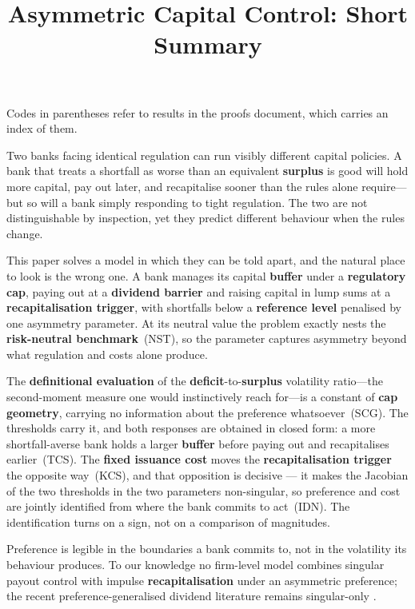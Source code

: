 \documentclass[11pt]{article}
\title{Asymmetric Capital Control: Short Summary}
\date{}
\begin{document}
\maketitle
\thispagestyle{empty}

\noindent
Codes in parentheses refer to results in the proofs document, which
carries an index of them.

\bigskip

Two banks facing identical regulation can run visibly different capital
policies. A bank that treats a shortfall as worse than an equivalent
\textbf{surplus} is good will hold more capital, pay out later, and
recapitalise sooner than the rules alone require---but so will a bank
simply responding to tight regulation. The two are not distinguishable by
inspection, yet they predict different behaviour when the rules change.

This paper solves a model in which they can be told apart, and the natural
place to look is the wrong one. A bank manages its capital \textbf{buffer}
under a \textbf{regulatory cap}, paying out at a \textbf{dividend barrier} and
raising capital in lump sums at a \textbf{recapitalisation trigger}, with
shortfalls below a \textbf{reference level} penalised by one asymmetry
parameter. At its neutral value the problem exactly nests the
\textbf{risk-neutral benchmark}~(NST), so the parameter captures asymmetry
beyond what regulation and costs alone produce.

The \textbf{definitional evaluation} of the \textbf{deficit}-to-\textbf{surplus} volatility
ratio---the second-moment measure one would instinctively reach for---is a
constant of \textbf{cap geometry}, carrying no information about the preference
whatsoever~(SCG). The thresholds carry it, and both responses are obtained
in closed form: a more shortfall-averse bank holds a larger \textbf{buffer}
before paying out and recapitalises earlier~(TCS). The \textbf{fixed issuance
cost} moves the \textbf{recapitalisation trigger} the opposite way~(KCS), and
that opposition is decisive --- it makes the Jacobian of the two thresholds
in the two parameters non-singular, so preference and cost are jointly
identified from where the bank commits to act~(IDN). The identification turns on a sign, not on a
comparison of magnitudes.

Preference is legible in the boundaries a bank commits to, not in the
volatility its behaviour produces. To our knowledge no firm-level model
combines singular payout control with impulse \textbf{recapitalisation} under
an asymmetric preference; the recent preference-generalised dividend
literature remains singular-only \citep{chen2026,cao2026}.



\end{document}
